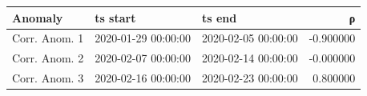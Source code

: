 \begin{tabular}{lllr}
\toprule
Anomaly & ts start & ts end & ρ \\
\midrule
Corr. Anom. 1 & 2020-01-29 00:00:00 & 2020-02-05 00:00:00 & -0.900000 \\
Corr. Anom. 2 & 2020-02-07 00:00:00 & 2020-02-14 00:00:00 & -0.000000 \\
Corr. Anom. 3 & 2020-02-16 00:00:00 & 2020-02-23 00:00:00 & 0.800000 \\
\bottomrule
\end{tabular}
